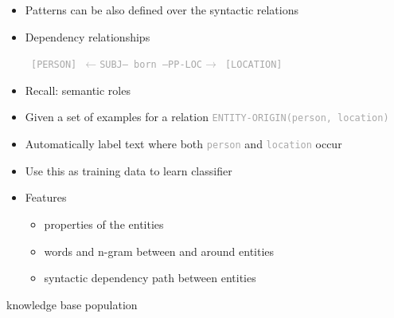 \documentclass[landscape]{jhuslides3C}
\begin{document}

\vfill
\begin{itemize}\itemsep 1cm
\item Patterns can be also defined over the syntactic relations
\item Dependency relationships
\textcolor{darkgrey}{\begin{flushleft} \tt
[PERSON] $\leftarrow$SUBJ{\rm ---} born {\rm ---}PP-LOC$\rightarrow$ [LOCATION]
\end{flushleft}}
\item Recall: semantic roles
\end{itemize}
\vfill


\vfill
\begin{itemize}
\item Given a set of examples for a relation \textcolor{darkgrey}{\tt {\small ENTITY-ORIGIN}(person, location)}
\item Automatically label text where both \textcolor{darkgrey}{\tt person} and \textcolor{darkgrey}{\tt location} occur
\item Use this as training data to learn classifier
\item Features
\begin{itemize}
\item properties of the entities
\item words and n-gram between and around entities
\item syntactic dependency path between entities
\end{itemize}
\end{itemize}
\vfill


\slide{}
\vspace{85mm}
\begin{center}
{\huge knowledge base population}
\end{center}

\end{document}
